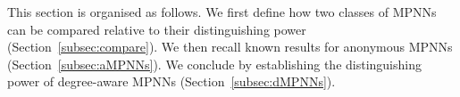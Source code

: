 This section is organised as follows. We first define how two classes of MPNNs can be compared relative to  their distinguishing power (Section~\ref{subsec:compare}). We then recall known results for anonymous MPNNs (Section~\ref{subsec:aMPNNs}). We conclude by establishing the distinguishing power of degree-aware MPNNs (Section~\ref{subsec:dMPNNs}).




% 



